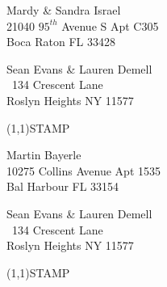 \documentclass[12pt]{article}
\begin{document}
\begin{center} \begin{Huge} \vspace*{\fill}
Mardy \& Sandra Israel\\
21040 $95^{th}$ Avenue S Apt C305\\
Boca Raton FL 33428\\
\vspace{\fill} \end{Huge} \end{center}

\clearpage

\begin{minipage}{.5\linewidth} \noindent
Sean Evans \& Lauren Demell\\\ 
134 Crescent Lane\\ 
Roslyn Heights NY 11577
\end{minipage}
\begin{minipage}{.5\linewidth \hspace{-.2in} \vspace{-.3in}}
\begin{flushright}
\framebox(1,1){STAMP}
\end{flushright}
\end{minipage}

\begin{center} \begin{Huge} \vspace*{\fill}
Martin Bayerle\\
10275 Collins Avenue Apt 1535\\
Bal Harbour FL 33154\\
\vspace{\fill} \end{Huge} \end{center}

\clearpage

\begin{minipage}{.5\linewidth} \noindent
Sean Evans \& Lauren Demell\\\ 
134 Crescent Lane\\ 
Roslyn Heights NY 11577
\end{minipage}
\begin{minipage}{.5\linewidth \hspace{-.2in} \vspace{-.3in}}
\begin{flushright}
\framebox(1,1){STAMP}
\end{flushright}
\end{minipage}
\end{document}
